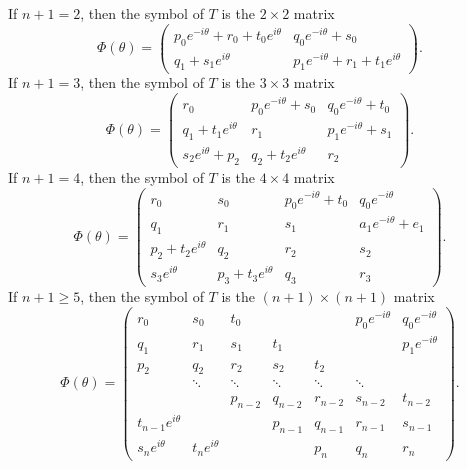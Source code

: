 \documentclass[12pt,reqno]{amsart}
\theoremstyle{definition}
\begin{document}
If $n+1=2$, then the symbol of $T$ is the $2\times 2$ matrix 
\begin{equation*}
    \Phi(\theta)=
        \begin{pmatrix}
        p_0 e^{-i \theta} +r_0 +t_0 e^{i \theta}  & q_0 e^{-i \theta}+s_0  \\ 
        q_1 +s_1 e^{i \theta}  & p_1 e^{-i \theta} +r_1 +t_1 e^{i \theta}
        \end{pmatrix}.
\end{equation*}
If $n+1=3$, then the  symbol of $T$ is the $3\times 3$ matrix 
\begin{equation*}
    \Phi(\theta)=
        \begin{pmatrix}
          r_0  & p_0 e^{-i \theta} +s_0   & q_0 e^{-i \theta} +t_0   \\
         q_1  +t_1  e^{i \theta}  & r_1 & p_1 e^{-i \theta} +s_1   \\
        s_2 e^{i \theta} +p_2 & q_2+t_2 e^{i \theta} & r_2 
     \end{pmatrix}.
 \end{equation*} 
If $n+1=4$, then the symbol of $T$ is the $4 \times 4$ matrix 
\begin{equation*}
    \Phi(\theta)=
        \begin{pmatrix}
          r_0  & s_0  & p_0 e^{-i \theta} + t_0  & q_0 e^{-i \theta}   \\
          q_1  &  r_1 & s_1 & a_1 e^{-i \theta}  +e_1      \\
          p_2 +t_2 e^{i \theta} & q_2 & r_2 & s_2 \\
          s_3 e^{i\theta}    &  p_3 +t_3 e^{i\theta} & q_3 & r_3  
    \end{pmatrix}.
    \end{equation*} 
If $n+1\geq 5$, then the symbol of $T$ is the $(n+1)\times(n+1)$ matrix
\[
\Phi(\theta)= \begin{pmatrix}
 r_0 & s_0 & t_0 & & & p_0 e^{-i \theta} & q_0 e^{-i\theta}\\
q_1 & r_1 & s_1 & t_1 & & & p_1 e^{-i \theta} \\
p_2 & q_{2} & r_2 & s_2 & t_2 & & \\
    & \ddots & \ddots &\ddots & \ddots & \ddots   & \\
& & p_{n-2} & q_{n-2} & r_{n-2} & s_{n-2} & t_{n-2}\\
t_{n-1} e^{i \theta} & & & p_{n-1} & q_{n-1} & r_{n-1} & s_{n-1} \\
s_n e^{i\theta} & t_n e^{i\theta} & & & p_n & q_n & r_n
\end{pmatrix}.
\]
\end{document}

